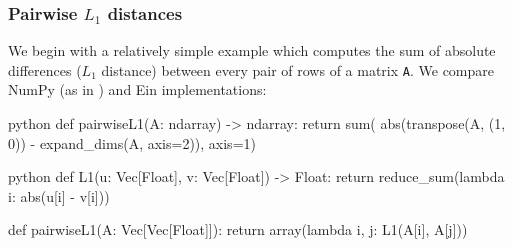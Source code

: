\subsubsection{Pairwise $L_1$ distances}

We begin with a relatively simple example which computes the sum of absolute differences ($L_1$ distance) between every pair of rows of a matrix \texttt{A}. 
We compare NumPy (as in \cite{maclaurin2019dex}) and Ein implementations:
\begin{center}    
\begin{minipage}[t]{.5\textwidth}
\raggedright
\begin{center}    
  \begin{cminted}{python}
def pairwiseL1(A: ndarray) -> ndarray:
  return sum(
    abs(transpose(A, (1, 0)) 
        - expand_dims(A, axis=2)),
    axis=1)
  \end{cminted}
\end{center}
\end{minipage}%
\begin{minipage}[t]{.5\textwidth}
\raggedleft
\begin{center}    
  \begin{cminted}{python}
def L1(u: Vec[Float], v: Vec[Float]) -> Float:
  return reduce_sum(lambda i: abs(u[i] - v[i]))

def pairwiseL1(A: Vec[Vec[Float]]):
  return array(lambda i, j: L1(A[i], A[j]))
  \end{cminted}
\end{center}
\end{minipage}
\end{center}
